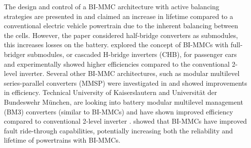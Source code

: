 \documentclass{article}
\begin{document}
The design and control of a BI-MMC architecture with active balancing strategies are presented in \cite{quraan2015design} and claimed an increase in lifetime compared to a conventional electric vehicle powertrain due to the inherent balancing between the cells. However, the paper considered half-bridge converters as submodules, this increases losses on the battery.
\cite{josefsson2015investigation} explored the concept of BI-MMCs with full-bridger submodules, or cascaded H-bridge inverters (CHB), for passenger cars and experimentally showed higher efficiencies compared to the conventional 2-level inverter. Several other BI-MMC architectures, such as modular multilevel series-parallel converters (MMSP) were investigated in \cite{korte2017efficiency,kersten2021modular} and showed improvements in efficiency. Technical University of Kaiserslautern and Universität der Bundeswehr München, are looking into battery modular multilevel management (BM3) converters (similar to BI-MMCs) and have shown improved efficiency compared to conventional 2-level inverter \cite{kuder2020battery}. \cite{ma2018analysis} showed that BI-MMCs have improved fault ride-through capabilities, potentially increasing both the reliability and lifetime of powertrains with BI-MMCs.
\end{document}
